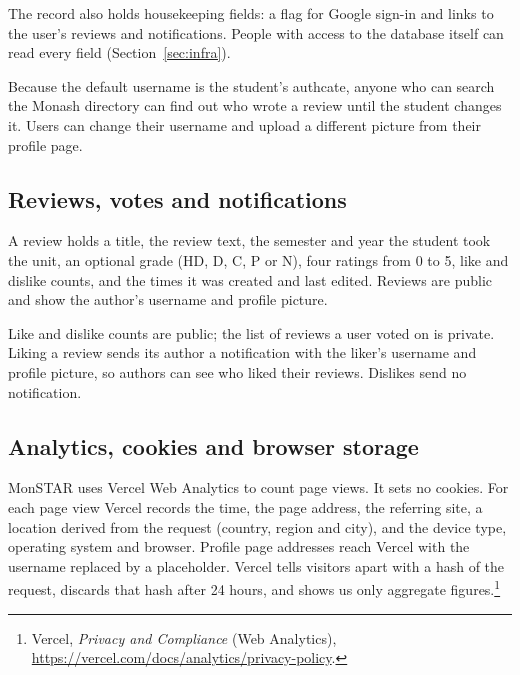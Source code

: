 \documentclass[11pt,a4paper]{article}
\begin{document}
The record also holds housekeeping fields: a flag for Google sign-in and
links to the user's reviews and notifications.  People with access to the
database itself can read every field (Section~\ref{sec:infra}).

Because the default username is the student's authcate, anyone who can search
the Monash directory can find out who wrote a review until the student
changes it.  Users can change their username and upload a different picture
from their profile page.

\subsection{Reviews, votes and notifications}

A review holds a title, the review text, the semester and year the student
took the unit, an optional grade (HD, D, C, P or N), four ratings from 0 to
5, like and dislike counts, and the times it was created and last edited.
Reviews are public and show the author's username and profile picture.

Like and dislike counts are public; the list of reviews a user voted on is
private.  Liking a review sends its author a notification with the liker's
username and profile picture, so authors can see who liked their reviews.
Dislikes send no notification.

\subsection{Analytics, cookies and browser storage}

MonSTAR uses Vercel Web Analytics to count page views.  It sets no cookies.
For each page view Vercel records the time, the page address, the referring
site, a location derived from the request (country, region and city), and
the device type, operating system and browser.  Profile page addresses reach
Vercel with the username replaced by a placeholder.  Vercel tells visitors apart
with a hash of the request, discards that hash after 24 hours, and shows us
only aggregate figures.\footnote{Vercel, \emph{Privacy and Compliance} (Web
Analytics), \url{https://vercel.com/docs/analytics/privacy-policy}.}
\end{document}
